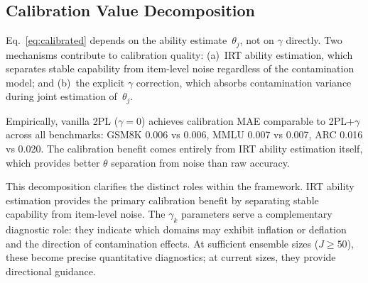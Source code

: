 \subsection{Calibration Value Decomposition}
\label{sec:value_decomposition}

Eq.~\eqref{eq:calibrated} depends on the ability estimate~$\theta_j$, not on $\gamma$ directly. Two mechanisms contribute to calibration quality: (a)~IRT ability estimation, which separates stable capability from item-level noise regardless of the contamination model; and (b)~the explicit $\gamma$ correction, which absorbs contamination variance during joint estimation of~$\theta_j$.

Empirically, vanilla 2PL ($\gamma\!=\!0$) achieves calibration MAE comparable to 2PL+$\gamma$ across all benchmarks: GSM8K 0.006 vs 0.006, MMLU 0.007 vs 0.007, ARC 0.016 vs 0.020. The calibration benefit comes entirely from IRT ability estimation itself, which provides better $\theta$ separation from noise than raw accuracy.

This decomposition clarifies the distinct roles within the framework. IRT ability estimation provides the primary calibration benefit by separating stable capability from item-level noise. The $\gamma_k$ parameters serve a complementary diagnostic role: they indicate which domains may exhibit inflation or deflation and the direction of contamination effects. At sufficient ensemble sizes ($J \geq 50$), these become precise quantitative diagnostics; at current sizes, they provide directional guidance.